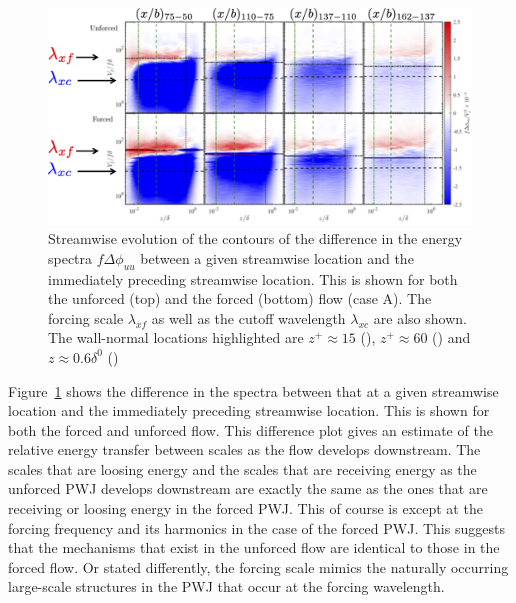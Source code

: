 \begin{figure}[h]
	\centering
	\includegraphics[width=.9\textwidth]{pics/specEvol3.png}
	\caption{Streamwise evolution of the contours of the difference in the energy spectra $f\Delta \phi_{uu}$ between a given streamwise location and the immediately preceding streamwise location. This is shown for both the unforced (top) and the forced (bottom) flow (case A). The forcing scale $\lambda_{xf}$ as well as the cutoff wavelength $\lambda_{xc}$ are also shown. The wall-normal locations highlighted are $z^+\approx 15$ (\textcolor{green}{\chain}), $z^+\approx 60$ (\textcolor{green}{\dashed}) and $z\approx 0.6\delta^0$ (\textcolor{black}{\dotted})}
	\label{fg:specEvol3}
\end{figure}

Figure~\ref{fg:specEvol3} shows the difference in the spectra between that at a given streamwise location and the immediately preceding streamwise location. This is shown for both the forced and unforced flow. This difference plot gives an estimate of the relative energy transfer between scales as the flow develops downstream. The scales that are loosing energy and the scales that are receiving energy as the unforced PWJ develops downstream are exactly the same as the ones that are receiving or loosing energy in the forced PWJ. This of course is except at the forcing frequency and its harmonics in the case of the forced PWJ. This suggests that the mechanisms that exist in the unforced flow are identical to those in the forced flow. Or stated differently, the forcing scale mimics the naturally occurring large-scale structures in the PWJ that occur at the forcing wavelength. 



